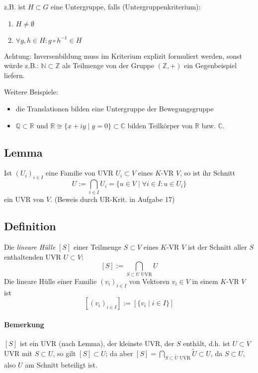  		z.B. ist $H\subset G$ eine Untergruppe, falls (Untergruppenkriterium):
 		\begin{enumerate}
 			\item $H\neq \emptyset$
 			\item $\forall g,h\in H: g\circ h^{-1} \in H$
 		\end{enumerate}

 		Achtung: Inversenbildung muss im Kriterium explizit formuliert werden, sonst würde z.B.: $\mathbb{N}\subset\mathbb{Z}$ als Teilmenge von der Gruppe $(\mathbb{Z}, +)$ ein Gegenbeispiel liefern.

 		Weitere Beispiele:
 		\begin{itemize}
 			\item die Translationen bilden eine Untergruppe der Bewegungsgruppe
 			\item $\mathbb{Q}\subset\mathbb{R}$ und $\mathbb{R}\cong \{x+iy\mid y=0\}\subset\mathbb{C}$ bilden Teilkörper von $\mathbb{R}$ bzw. $\mathbb{C}$.
 		\end{itemize}

 \subsection{Lemma}
 	\begin{Lemma}
 		Ist $(U_i)_{i\in I}$ eine Familie von UVR $U_i\subset V$ eines $K$-VR $V$, so ist ihr Schnitt
 		\[
 			U:= \bigcap_{i\in I}U_i =\{ u\in V\mid \forall i\in I: u\in U_i\}
 		\]
 		ein UVR von $V$. (Beweis durch UR-Krit. in Aufgabe 17)
 	\end{Lemma}

 \subsection{Definition}
 	\begin{Definition}
 		Die \emph{lineare Hülle} $[S]$ einer Teilmenge $S\subset V$ eines $ K $-VR $ V $ ist der Schnitt aller $S$ enthaltenden UVR $U\subset V$:
 		\[
 			[S] := \bigcap_{S\subset U \text{ UVR}} U
 		\]
 		Die lineare Hülle einer Familie $(v_i)_{i\in I}$ von Vektoren $v_i\in V$ in einem $ K $-VR $ V $ ist
 		\[
 			[(v_i)_{i\in I}] := [\{v_i\mid i\in I\}]
 		\]
 	\end{Definition}

 	\paragraph{Bemerkung}
 		$[S]$ ist ein UVR (nach Lemma), der \glqq kleinste\grqq{} UVR, der $S$ enthält, d.h. ist $U\subset V$ UVR mit $S\subset U$, so gilt $[S]\subset U$; da aber $[S] = \bigcap_{S\subset \tilde{U}  \text{ UVR}}\tilde{U}\subset U$,
 		da $S\subset U$, also $U$ am Schnitt beteiligt ist.

